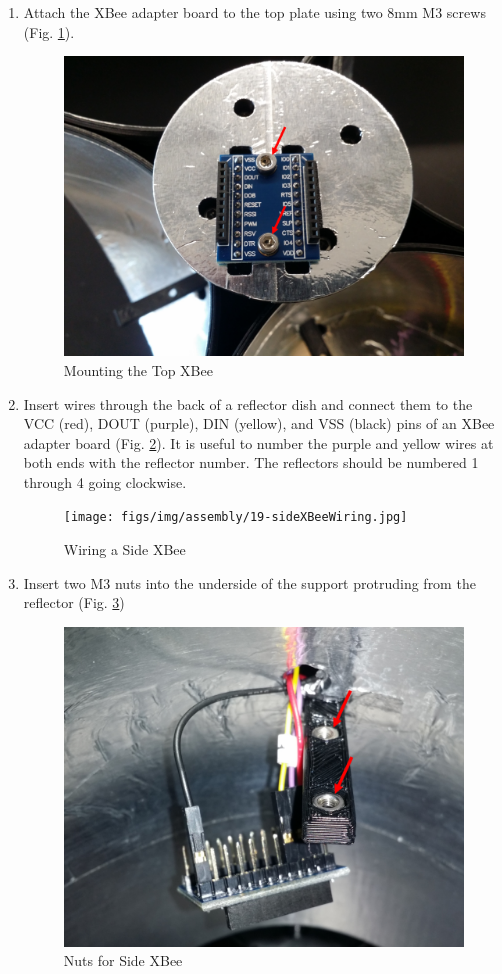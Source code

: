 \begin{enumerate}[label = \textbf{Step \arabic*.}]
    \item Attach the XBee adapter board to the top plate using two 8mm M3 screws (Fig. \ref{fig:topXBeeMounting}).
    \begin{figure}[H]
        \centering
        \includegraphics[width=4.2in]{figs/img/assembly/18-topXBeeMounting.png}
        \caption{Mounting the Top XBee}
        \label{fig:topXBeeMounting}
    \end{figure}

    \item Insert wires through the back of a reflector dish and connect them to the VCC (red), DOUT (purple), DIN (yellow), and VSS (black) pins of an XBee adapter board (Fig. \ref{fig:sideXBeeWiring}). It is useful to number the purple and yellow wires at both ends with the reflector number. The reflectors should be numbered 1 through 4 going clockwise.
    \begin{figure}[H]
        \centering
        \texttt{[image: figs/img/assembly/19-sideXBeeWiring.jpg]}
        \caption{Wiring a Side XBee}
        \label{fig:sideXBeeWiring}
    \end{figure}
    \pagebreak

    \item Insert two M3 nuts into the underside of the support protruding from the reflector (Fig. \ref{fig:sideXBeeNuts})
    \begin{figure}[H]
        \centering
        \includegraphics[width=4.2in]{figs/img/assembly/20-sideXBeeNuts.png}
        \caption{Nuts for Side XBee}
        \label{fig:sideXBeeNuts}
    \end{figure}


\end{enumerate}
